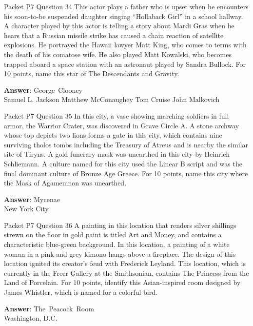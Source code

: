 \begin{frame}{Packet P7 Question 34}
This actor plays a father   who is upset when he encounters his soon-to-be suspended daughter singing “Hollaback Girl” in a school hallway. A character played by this actor is telling a story about Mardi Gras when he hears that a Russian missile strike has caused a chain reaction of satellite explosions. He portrayed the Hawaii lawyer Matt King, who comes to terms with the death of his comatose wife. He also played Matt Kowalski, who becomes trapped aboard a space station with an astronaut played by   Sandra Bullock. For 10 points, name this star of The Descendants and Gravity.    

\textbf{Answer}: George\ Clooney\\
 Samuel L. Jackson
 Matthew McConaughey
 Tom Cruise
 John Malkovich
\end{frame}

\begin{frame}{Packet P7 Question 35}
In this city, a vase showing marching soldiers in full armor, the Warrior Crater, was discovered in Grave Circle A. A stone archway whose top depicts two lions forms a gate in this city, which contains nine surviving tholos tombs including the   Treasury of Atreus and is nearby the similar site of Tiryns.   A gold funerary mask was unearthed in this city by Heinrich Schliemann. A culture   named for this city used the Linear B script and was the final dominant culture of Bronze Age Greece. For 10 points, name this city where the Mask of Agamemnon was unearthed.  

\textbf{Answer}: Mycenae\\
 New York City
\end{frame}

\begin{frame}{Packet P7 Question 36}
A painting in this location that renders silver shillings strewn on the floor in gold paint is titled Art and Money, and contains   a characteristic blue-green background. In this location, a painting of a white woman in a pink and grey kimono hangs above a fireplace. The design of this location ignited its creator’s feud with Frederick Leyland. This location, which   is currently in the Freer Gallery at the Smithsonian, contains The Princess from the Land of Porcelain. For 10 points,   identify this Asian-inspired room designed by James Whistler, which is named for a colorful bird.  

\textbf{Answer}: The\ Peacock\ Room\\
 Washington, D.C.
\end{frame}

